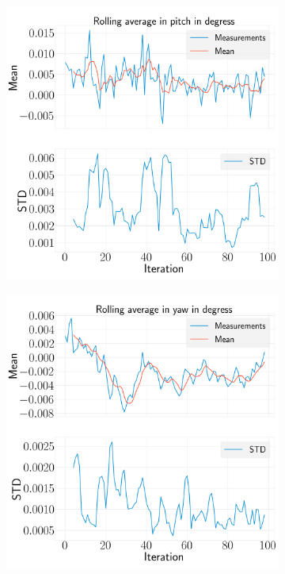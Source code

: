 \documentclass[../Head/report.tex]{subfiles}
\begin{document}
\begin{figure}[H]
\begin{subfigure}[t]{.30\textwidth}
        \includegraphics[width=\textwidth]{../Figures/analyse_rolling_average/test1/Calculated_rolling_average_in_pitch_with_mean_and_STD.png}
        \caption{}
        \label{fig:rolling_average_in_pitch_test1}
    \end{subfigure}
     \hspace{0.2em}
    \begin{subfigure}[t]{.30\textwidth}
        \centering
        \includegraphics[width=\textwidth]{../Figures/analyse_rolling_average/test1/Calculated_rolling_average_in_yaw_with_mean_and_STD.png}

\end{subfigure}
\end{figure}
\end{document}
